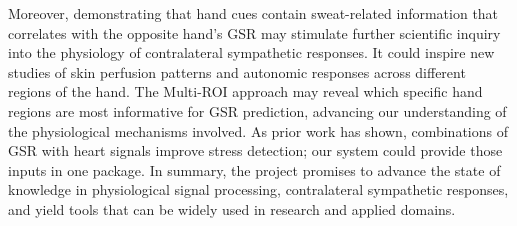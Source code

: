 \documentclass[12pt]{article}
\begin{document}
    Moreover, demonstrating that hand cues contain sweat-related information that correlates with the opposite hand's GSR may stimulate further scientific inquiry into the physiology of contralateral sympathetic responses. It could inspire new studies of skin perfusion patterns and autonomic responses across different regions of the hand. The Multi-ROI approach may reveal which specific hand regions are most informative for GSR prediction, advancing our understanding of the physiological mechanisms involved. As prior work has shown, combinations of GSR with heart signals improve stress detection; our system could provide those inputs in one package. In summary, the project promises to advance the state of knowledge in physiological signal processing, contralateral sympathetic responses, and yield tools that can be widely used in research and applied domains.
\end{document}
